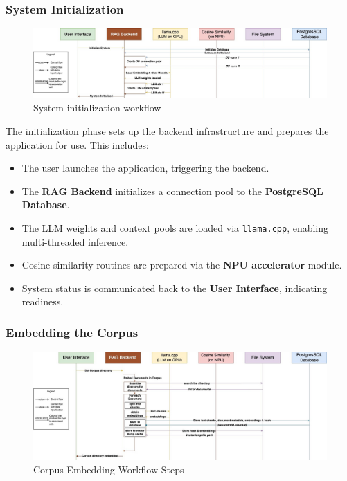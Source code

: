 \subsubsection{System Initialization}
\label{subsec:AppDesignWorkflow-SystemInitialization}

\begin{figure}[H]
    \centering
    \includegraphics[width=1.0\linewidth]{images/tldr-app-worklfow-pt1.jpg}
    \caption{System initialization workflow}
    \label{fig:tldrsysteminitworkflow}
\end{figure}


The initialization phase sets up the backend infrastructure and prepares the application for use. This includes:

\begin{itemize}
    \item The user launches the application, triggering the backend.
    \item The \textbf{RAG Backend} initializes a connection pool to the \textbf{PostgreSQL Database}.
    \item The LLM weights and context pools are loaded via \texttt{llama.cpp}, enabling multi-threaded inference.
    \item Cosine similarity routines are prepared via the \textbf{NPU accelerator} module.
    \item System status is communicated back to the \textbf{User Interface}, indicating readiness.
\end{itemize}


\subsubsection{Embedding the Corpus}
\label{subsec:AppDesignWorkflow-EmbeddingCorpus}

\begin{figure}[H]
    \centering
    \includegraphics[width=1.0\linewidth]{images/tldr-app-worklfow-pt2.jpg}
    \caption{Corpus Embedding Workflow Steps}
    \label{fig:corpusembedworkflowsteps}
\end{figure}

